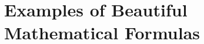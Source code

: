 \documentclass[12pt]{article}
\begin{document}
\section*{Examples of Beautiful Mathematical Formulas}

\end{document}
